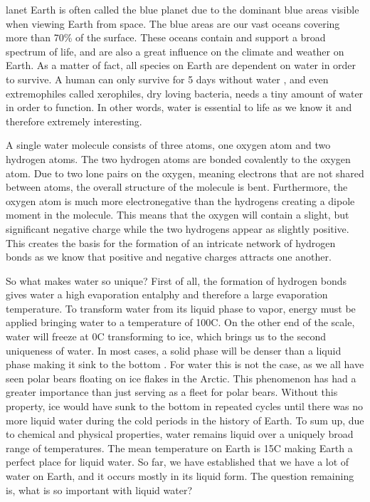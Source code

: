 \noindent
{}lanet Earth is often called the blue planet due to the dominant blue areas visible when viewing Earth from space.
The blue areas are our vast oceans covering more than 70\% \cite{WikiEarth} of the surface.
These oceans contain and support a broad spectrum of life, and are also a great influence on the climate and weather on Earth.
As a matter of fact, all species on Earth are dependent on water in order to survive.
A human can only survive for 5 days without water \cite{SurviveWater}, and even extremophiles called xerophiles, dry loving bacteria, needs a tiny amount of water in order to function.
In other words, water is essential to life as we know it and therefore extremely interesting. 

A single water molecule consists of three atoms, one oxygen atom and two hydrogen atoms.
The two hydrogen atoms are bonded covalently to the oxygen atom.
Due to two lone pairs on the oxygen, meaning electrons that are not shared between atoms, the overall structure of the molecule is bent.
Furthermore, the oxygen atom is much more electronegative than the hydrogens creating a dipole moment in the molecule.
This means that the oxygen will contain a slight, but significant negative charge while the two hydrogens appear as slightly positive.
This creates the basis for the formation of an intricate network of hydrogen bonds as we know that positive and negative charges attracts one another.  

So what makes water so unique?
First of all, the formation of hydrogen bonds gives water a high evaporation entalphy and therefore a large evaporation temperature.
To transform water from its liquid phase to vapor, energy must be applied bringing water to a temperature of 100\degree C.
On the other end of the scale, water will freeze at 0\degree C transforming to ice, which brings us to the second uniqueness of water.
In most cases, a solid phase will be denser than a liquid phase making it sink to the bottom \cite{SolidWater}.
For water this is not the case, as we all have seen polar bears floating on ice flakes in the Arctic.
This phenomenon has had a greater importance than just serving as a fleet for polar bears.
Without this property, ice would have sunk to the bottom in repeated cycles until there was no more liquid water during the cold periods in the history of Earth.
To sum up, due to chemical and physical properties, water remains liquid over a uniquely broad range of temperatures.
The mean temperature on Earth is 15\degree C \cite{WikiEarth} making Earth a perfect place for liquid water.
So far, we have established that we have a lot of water on Earth, and it occurs mostly in its liquid form.
The question remaining is, what is so important with liquid water? 

